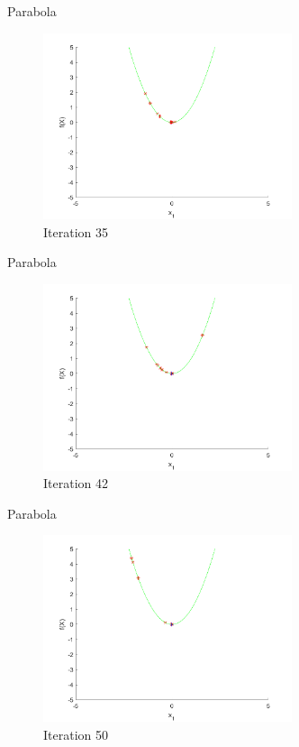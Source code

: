 \documentclass[xcolor=table]{beamer}
\begin{document}
\begin{frame}{Parabola}
  \begin{figure}[h]
  \begin{center}
    \includegraphics[width=0.65\textwidth]{img/smpl/circ/loa-iter-35}
    \caption{Iteration 35}
  \end{center}
  \end{figure}
\end{frame}
\begin{frame}{Parabola}
  \begin{figure}[h]
  \begin{center}
    \includegraphics[width=0.65\textwidth]{img/smpl/circ/loa-iter-42}
    \caption{Iteration 42}
  \end{center}
  \end{figure}
\end{frame}
\begin{frame}{Parabola}
  \begin{figure}[h]
  \begin{center}
    \includegraphics[width=0.65\textwidth]{img/smpl/circ/loa-iter-50}
    \caption{Iteration 50}
  \end{center}
  \end{figure}
\end{frame}
\end{document}
